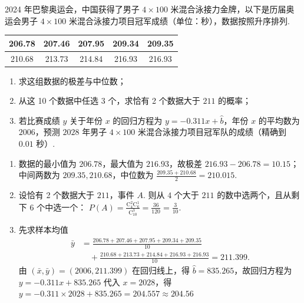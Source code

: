 \documentclass[UTF8,a4paper,oneside,11pt]{ctexbook}
\begin{document}
\begin{problem}
2024 年巴黎奥运会，中国获得了男子 \(4\times100\) 米混合泳接力金牌，以下是历届奥运会男子 \(4\times100\) 米混合泳接力项目冠军成绩（单位：秒），数据按照升序排列.

\begin{center}
\begin{tabular}{|c|c|c|c|c|}
\hline
206.78 & 207.46 & 207.95 & 209.34 & 209.35 \\
\hline
210.68 & 213.73 & 214.84 & 216.93 & 216.93 \\
\hline
\end{tabular}
\end{center}

\begin{enumerate}
\item 求这组数据的极差与中位数；
\item 从这 10 个数据中任选 3 个，求恰有 2 个数据大于 \(211\) 的概率；
\item 若比赛成绩 \(y\) 关于年份 \(x\) 的回归方程为 \(y=-0.311x+\hat b\)，年份 \(x\) 的平均数为 \(2006\)，预测 \(2028\) 年男子 \(4\times100\) 米混合泳接力项目冠军队的成绩（精确到 \(0.01\) 秒）.
\end{enumerate}
\end{problem}

\begin{solution}
\begin{enumerate}
\item 数据的最小值为 \(206.78\)，最大值为 \(216.93\)，故极差 \(216.93-206.78=10.15\)；中间两数为 \(209.35,210.68\)，中位数为 \(\frac{209.35+210.68}{2}=210.015\).

\item 设恰有 2 个数据大于 \(211\)，事件 \(A\). 则从 \(4\) 个大于 \(211\) 的数中选两个，且从剩下 \(6\) 个中选一个：
\(P(A)=\frac{\mathrm C_4^2\mathrm C_6^1}{\mathrm C_{10}^3}=\frac{36}{120}=\frac3{10}\).

\item 先求样本均值
\[
\begin{aligned}
\bar y
&=\frac{206.78+207.46+207.95+209.34+209.35}{10}\\
&\quad+\frac{210.68+213.73+214.84+216.93+216.93}{10}=211.399.
\end{aligned}
\]
由 \((\bar x,\bar y)=(2006,211.399)\) 在回归线上，得 \(\hat b=835.265\)，故回归方程为
\(
y=-0.311x+835.265
\)
代入 \(x=2028\)，得
\(
y=-0.311\times2028+835.265 =204.557\approx204.56
\)
\end{enumerate}
\end{solution}
\end{document}
